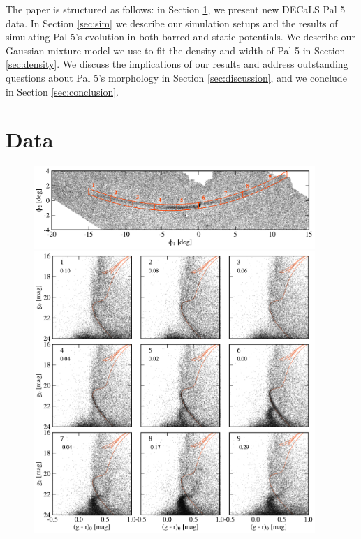 \documentclass[modern]{aastex62}
\begin{document}
The paper is structured as follows: in Section \ref{sec:data}, we present new DECaLS Pal 5 data. In Section \ref{sec:sim} we describe our simulation setups and the results of simulating Pal 5's evolution in both barred and static potentials. We describe our Gaussian mixture model we use to fit the density and width of Pal 5 in Section \ref{sec:density}. We discuss the implications of our results and address outstanding questions about Pal 5's morphology in Section \ref{sec:discussion}, and we conclude in Section \ref{sec:conclusion}. 



\section{Data}
\label{sec:data}

\begin{figure}
\begin{center}
\includegraphics[width=0.95\textwidth]{fig1_a_map.pdf}
\includegraphics[width=0.95\textwidth]{fig1_b_cmds.pdf}

\end{center}
\end{figure}
\end{document}

